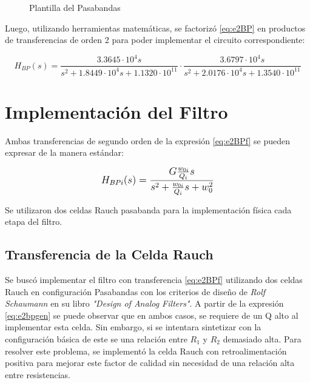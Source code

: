 \begin{figure}[ht]
\begin{center}

\end{center}
\caption{Plantilla del Pasabandas}
\label{fig:e2template}
\end{figure}

Luego, utilizando herramientas matemáticas, se factorizó \eqref{eq:e2BP} en productos de transferencias de orden 2 para poder implementar el circuito correspondiente:

\begin{equation}
H_{BP}(s)=\frac{3.3645\cdot 10^4s}{s^2 + 1.8449\cdot10^4 s + 1.1320\cdot10^{11}} \cdot \frac{3.6797\cdot 10^4s}{s^2 + 2.0176\cdot10^4 s + 1.3540\cdot10^{11}}
\label{eq:e2BPf}
\end{equation}

\section{Implementación del Filtro}

Ambas transferencias de segundo orden de la expresión \eqref{eq:e2BPf} se pueden expresar de la manera estándar:

\begin{equation}
\mathlarger{
H_{BPi} (s) = \frac{ G \frac{w_{0i}}{Q_i}s }{s^2+ \frac{w_{0i}}{Q_i}s+w_0^2}
}
\label{eq:e2bpgen}
\end{equation}

Se utilizaron dos celdas Rauch pasabanda para la implementación física cada etapa del filtro.

\subsection{Transferencia de la Celda Rauch}

\begin{figure}[ht]
\begin{center}

\label{fig:e2cell}
\end{center}
\end{figure}

Se buscó implementar el filtro con transferencia \eqref{eq:e2BPf} utilizando dos celdas Rauch en configuración Pasabandas con los criterios de diseño de \textit{Rolf Schaumann} en su libro \textit{"Design of Analog Filters"}. A partir de la expresión \eqref{eq:e2bpgen} se puede observar que en ambos casos, se requiere de un Q alto al implementar esta celda. Sin embargo, si se intentara sintetizar con la configuración básica de este se una relación entre $R_1$ y $R_2$ demasiado alta. Para resolver este problema, se implementó la celda Rauch con retroalimentación positiva para mejorar este factor de calidad sin necesidad de una relación alta entre resistencias.

